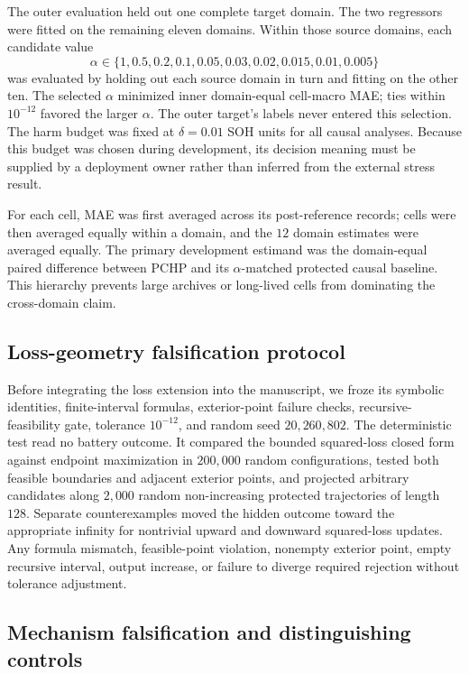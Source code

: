 \documentclass[11pt]{article}
\begin{document}
The outer evaluation held out one complete target domain. The two regressors were fitted on the remaining eleven domains. Within those source domains, each candidate value
\[
\alpha\in\{1,0.5,0.2,0.1,0.05,0.03,0.02,0.015,0.01,0.005\}
\]
was evaluated by holding out each source domain in turn and fitting on the other ten. The selected $\alpha$ minimized inner domain-equal cell-macro MAE; ties within $10^{-12}$ favored the larger $\alpha$. The outer target's labels never entered this selection. The harm budget was fixed at $\delta=0.01$ SOH units for all causal analyses. Because this budget was chosen during development, its decision meaning must be supplied by a deployment owner rather than inferred from the external stress result.

For each cell, MAE was first averaged across its post-reference records; cells were then averaged equally within a domain, and the $12$ domain estimates were averaged equally. The primary development estimand was the domain-equal paired difference between PCHP and its $\alpha$-matched protected causal baseline. This hierarchy prevents large archives or long-lived cells from dominating the cross-domain claim.

\subsection{Loss-geometry falsification protocol}

Before integrating the loss extension into the manuscript, we froze its symbolic identities, finite-interval formulas, exterior-point failure checks, recursive-feasibility gate, tolerance $10^{-12}$, and random seed $20{,}260{,}802$. The deterministic test read no battery outcome. It compared the bounded squared-loss closed form against endpoint maximization in $200{,}000$ random configurations, tested both feasible boundaries and adjacent exterior points, and projected arbitrary candidates along $2{,}000$ random non-increasing protected trajectories of length $128$. Separate counterexamples moved the hidden outcome toward the appropriate infinity for nontrivial upward and downward squared-loss updates. Any formula mismatch, feasible-point violation, nonempty exterior point, empty recursive interval, output increase, or failure to diverge required rejection without tolerance adjustment.

\subsection{Mechanism falsification and distinguishing controls}
\end{document}
